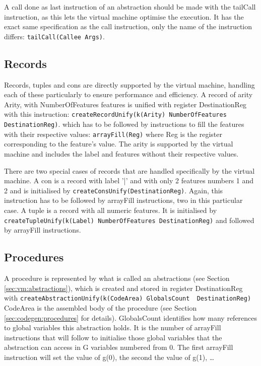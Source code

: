 \documentclass[a4paper]{memoir}
\begin{document}
A call done as last instruction of an abstraction should be made with the tailCall instruction, as this lets the virtual machine optimise the execution. It has the exact same specification as the call instruction, only the name of the instruction differs: \lstinline!tailCall(Callee Args)!.

\subsection{Records}\label{sec:opcode:records}
Records, tuples and cons are directly supported by the virtual machine, handling each of these particularly to ensure performance and efficiency.
A record of arity Arity, with NumberOfFeatures features is unified with register DestinationReg with this instruction:
\lstinline!createRecordUnify(k(Arity) NumberOfFeatures DestinationReg)!. which has to be followed by instructions to fill the features with their respective values:
\lstinline!arrayFill(Reg)! where Reg is the register corresponding to the feature's value.
The arity is supported by the virtual machine and includes the label and features without their respective values.

There are two special cases of records that are handled specifically by the virtual machine.
A con is a record with label '|' and with only 2 features numbers 1 and 2 and is initialised by
\lstinline!createConsUnify(DestinationReg)!. Again, this instruction has to be followed by arrayFill instructions, two in this particular case.
A tuple is a record with all numeric features. It is initialised by \lstinline!createTupleUnify(k(Label) NumberOfFeatures DestinationReg)! and followed by arrayFill instructions.
\subsection{Procedures}\label{sec:opcode:procedures}
A procedure is represented by what is called an abstractions (see Section \ref{sec:vm:abstractions}), which is created and stored in register DestinationReg with
\lstinline!createAbstractionUnify(k(CodeArea) GlobalsCount  DestinationReg)!
CodeArea is the assembled body of the procedure (see Section \ref{sec:codegen:procedures} for details). GlobalsCount identifies how many references to global variables this abstraction holds. It is the number of arrayFill instructions that will follow to initialise those global variables that the abstraction can access in G variables numbered from 0. The first arrayFill instruction will set the value of g(0), the second the value of g(1), \ldots
\end{document}
